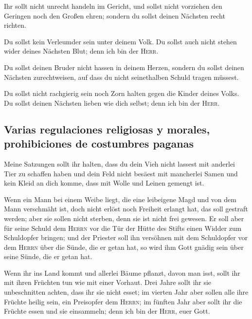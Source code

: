  Ihr sollt nicht unrecht handeln im Gericht, und sollst
nicht vorziehen den Geringen noch den Großen ehren; sondern du sollst
deinen Nächsten recht richten.

 Du sollst kein Verleumder sein unter deinem Volk. Du
sollst auch nicht stehen wider deines Nächsten Blut; denn ich bin der
\textsc{Herr}.

 Du sollst deinen Bruder nicht hassen in deinem Herzen,
sondern du sollst deinen Nächsten zurechtweisen, auf dass du nicht
seinethalben Schuld tragen müssest.

 Du sollst nicht rachgierig sein noch Zorn halten gegen
die Kinder deines Volks. Du sollst deinen Nächsten lieben wie dich
selbst; denn ich bin der \textsc{Herr}.

\hypertarget{varias-regulaciones-religiosas-y-morales-prohibiciones-de-costumbres-paganas}{%
\subsection{Varias regulaciones religiosas y morales, prohibiciones de
costumbres
paganas}\label{varias-regulaciones-religiosas-y-morales-prohibiciones-de-costumbres-paganas}}

 Meine Satzungen sollt ihr halten, dass du dein Vieh
nicht lassest mit anderlei Tier zu schaffen haben und dein Feld nicht
besäest mit mancherlei Samen und kein Kleid an dich komme, dass mit
Wolle und Leinen gemengt ist.

 Wenn ein Mann bei einem Weibe liegt, die eine leibeigene
Magd und von dem Mann verschmäht ist, doch nicht erlöst noch Freiheit
erlangt hat, das soll gestraft werden; aber sie sollen nicht sterben,
denn sie ist nicht frei gewesen.  Er soll aber für seine
Schuld dem \textsc{Herrn} vor die Tür der Hütte des Stifts einen Widder
zum Schuldopfer bringen;  und der Priester soll ihn
versöhnen mit dem Schuldopfer vor dem \textsc{Herrn} über die Sünde, die
er getan hat, so wird ihm Gott gnädig sein über seine Sünde, die er
getan hat.

 Wenn ihr ins Land kommt und allerlei Bäume pflanzt,
davon man isst, sollt ihr mit ihren Früchten tun wie mit einer Vorhaut.
Drei Jahre sollt ihr sie unbeschnitten achten, dass ihr sie nicht esset;
 im vierten Jahr aber sollen alle ihre Früchte heilig
sein, ein Preisopfer dem \textsc{Herrn};  im fünften Jahr
aber sollt ihr die Früchte essen und sie einsammeln; denn ich bin der
\textsc{Herr}, euer Gott.

